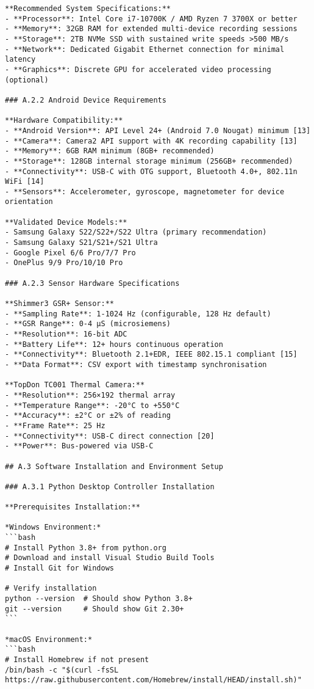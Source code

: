 \begin{verbatim}
**Recommended System Specifications:**
- **Processor**: Intel Core i7-10700K / AMD Ryzen 7 3700X or better
- **Memory**: 32GB RAM for extended multi-device recording sessions
- **Storage**: 2TB NVMe SSD with sustained write speeds >500 MB/s
- **Network**: Dedicated Gigabit Ethernet connection for minimal latency
- **Graphics**: Discrete GPU for accelerated video processing (optional)

### A.2.2 Android Device Requirements

**Hardware Compatibility:**
- **Android Version**: API Level 24+ (Android 7.0 Nougat) minimum [13]
- **Camera**: Camera2 API support with 4K recording capability [13]
- **Memory**: 6GB RAM minimum (8GB+ recommended)
- **Storage**: 128GB internal storage minimum (256GB+ recommended)
- **Connectivity**: USB-C with OTG support, Bluetooth 4.0+, 802.11n WiFi [14]
- **Sensors**: Accelerometer, gyroscope, magnetometer for device orientation

**Validated Device Models:**
- Samsung Galaxy S22/S22+/S22 Ultra (primary recommendation)
- Samsung Galaxy S21/S21+/S21 Ultra
- Google Pixel 6/6 Pro/7/7 Pro
- OnePlus 9/9 Pro/10/10 Pro

### A.2.3 Sensor Hardware Specifications

**Shimmer3 GSR+ Sensor:**
- **Sampling Rate**: 1-1024 Hz (configurable, 128 Hz default)
- **GSR Range**: 0-4 μS (microsiemens)
- **Resolution**: 16-bit ADC
- **Battery Life**: 12+ hours continuous operation
- **Connectivity**: Bluetooth 2.1+EDR, IEEE 802.15.1 compliant [15]
- **Data Format**: CSV export with timestamp synchronisation

**TopDon TC001 Thermal Camera:**
- **Resolution**: 256×192 thermal array
- **Temperature Range**: -20°C to +550°C
- **Accuracy**: ±2°C or ±2% of reading
- **Frame Rate**: 25 Hz
- **Connectivity**: USB-C direct connection [20]
- **Power**: Bus-powered via USB-C

## A.3 Software Installation and Environment Setup

### A.3.1 Python Desktop Controller Installation

**Prerequisites Installation:**

*Windows Environment:*
```bash
# Install Python 3.8+ from python.org
# Download and install Visual Studio Build Tools
# Install Git for Windows

# Verify installation
python --version  # Should show Python 3.8+
git --version     # Should show Git 2.30+
```

*macOS Environment:*
```bash
# Install Homebrew if not present
/bin/bash -c "$(curl -fsSL https://raw.githubusercontent.com/Homebrew/install/HEAD/install.sh)"


\end{verbatim}
